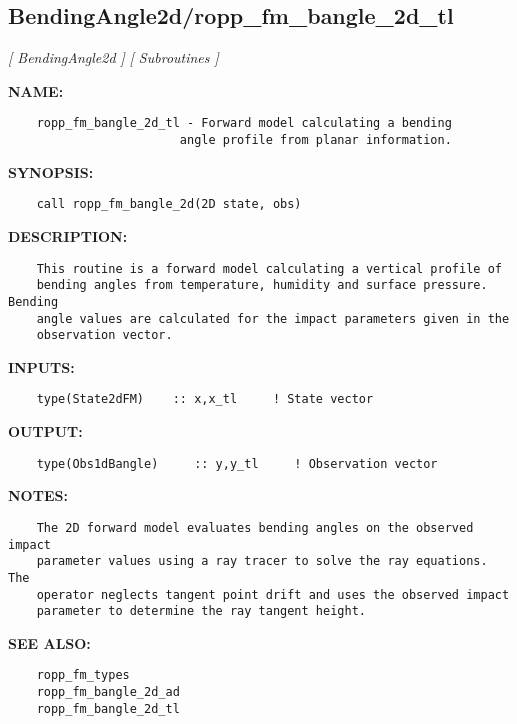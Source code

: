 \subsection{BendingAngle2d/ropp\_fm\_bangle\_2d\_tl}
\textsl{[ BendingAngle2d ]}
\textsl{[ Subroutines ]}

\label{ch:robo12}
\label{ch:BendingAngle2d_ropp_fm_bangle_2d_tl}
\textbf{NAME:}\hspace{0.08in}\begin{Verbatim}
    ropp_fm_bangle_2d_tl - Forward model calculating a bending
                        angle profile from planar information.
\end{Verbatim}
\textbf{SYNOPSIS:}\hspace{0.08in}\begin{Verbatim}
    call ropp_fm_bangle_2d(2D state, obs)
\end{Verbatim}
\textbf{DESCRIPTION:}\hspace{0.08in}\begin{Verbatim}
    This routine is a forward model calculating a vertical profile of
    bending angles from temperature, humidity and surface pressure. Bending
    angle values are calculated for the impact parameters given in the
    observation vector.
\end{Verbatim}
\textbf{INPUTS:}\hspace{0.08in}\begin{Verbatim}
    type(State2dFM)    :: x,x_tl     ! State vector
\end{Verbatim}
\textbf{OUTPUT:}\hspace{0.08in}\begin{Verbatim}
    type(Obs1dBangle)     :: y,y_tl     ! Observation vector
\end{Verbatim}
\textbf{NOTES:}\hspace{0.08in}\begin{Verbatim}
    The 2D forward model evaluates bending angles on the observed impact
    parameter values using a ray tracer to solve the ray equations. The
    operator neglects tangent point drift and uses the observed impact
    parameter to determine the ray tangent height.
\end{Verbatim}
\textbf{SEE ALSO:}\hspace{0.08in}\begin{Verbatim}
    ropp_fm_types
    ropp_fm_bangle_2d_ad
    ropp_fm_bangle_2d_tl
\end{Verbatim}
